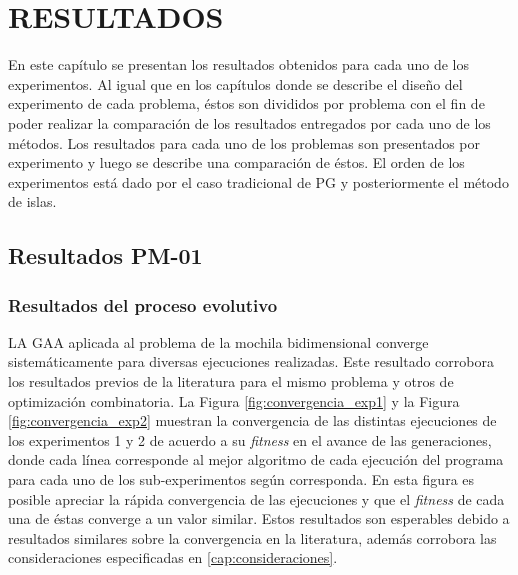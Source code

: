
\chapter{RESULTADOS}
\label{cap:resultados}


En este capítulo se presentan los resultados obtenidos para cada uno de los experimentos. Al igual que en los capítulos donde se describe el diseño del experimento de cada problema, éstos son divididos por problema con el fin de poder realizar la comparación de los resultados entregados por cada uno de los métodos. Los resultados para cada uno de los problemas son presentados por experimento y luego se describe una comparación de éstos. El orden de los experimentos está dado por el caso tradicional de PG y posteriormente el método de islas.

\section{Resultados PM-01}

\subsection{Resultados del proceso evolutivo}

LA GAA aplicada al problema de la mochila bidimensional converge sistemáticamente para diversas ejecuciones realizadas. Este resultado corrobora los resultados previos de la literatura para el mismo problema y otros de optimización combinatoria. La Figura \ref{fig:convergencia_exp1} y la Figura \ref{fig:convergencia_exp2} muestran la convergencia de las distintas ejecuciones de los experimentos 1 y 2 de acuerdo a su \textit{fitness} en el avance de las generaciones, donde cada línea corresponde al mejor algoritmo de cada ejecución del programa para cada uno de los sub-experimentos según corresponda. En esta figura es posible apreciar la rápida convergencia de las ejecuciones y que el \textit{fitness} de cada una de éstas converge a un valor similar. Estos resultados son esperables debido a resultados similares sobre la convergencia en la literatura, además corrobora las consideraciones especificadas en \ref{cap:consideraciones}.

